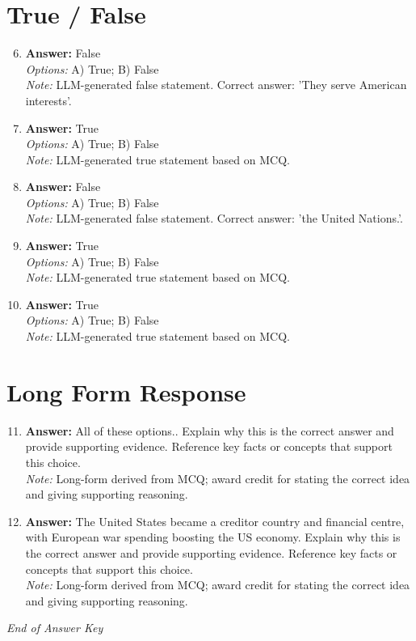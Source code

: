 \documentclass[12pt]{article}
\begin{document}
\section*{True / False}
\begin{enumerate}[label=\arabic*.]
\setcounter{enumi}{5}
\item \textbf{Answer:} False
\\ \textit{Options:} A) True; B) False
\\ \textit{Note:} LLM-generated false statement. Correct answer: 'They serve American interests'.
\item \textbf{Answer:} True
\\ \textit{Options:} A) True; B) False
\\ \textit{Note:} LLM-generated true statement based on MCQ.
\item \textbf{Answer:} False
\\ \textit{Options:} A) True; B) False
\\ \textit{Note:} LLM-generated false statement. Correct answer: 'the United Nations.'.
\item \textbf{Answer:} True
\\ \textit{Options:} A) True; B) False
\\ \textit{Note:} LLM-generated true statement based on MCQ.
\item \textbf{Answer:} True
\\ \textit{Options:} A) True; B) False
\\ \textit{Note:} LLM-generated true statement based on MCQ.
\end{enumerate}

\section*{Long Form Response}
\begin{enumerate}[label=\arabic*.]
\setcounter{enumi}{10}
\item \textbf{Answer:} All of these options.. Explain why this is the correct answer and provide supporting evidence. Reference key facts or concepts that support this choice.
\\ \textit{Note:} Long-form derived from MCQ; award credit for stating the correct idea and giving supporting reasoning.
\item \textbf{Answer:} The United States became a creditor country and financial centre, with European war spending boosting the US economy. Explain why this is the correct answer and provide supporting evidence. Reference key facts or concepts that support this choice.
\\ \textit{Note:} Long-form derived from MCQ; award credit for stating the correct idea and giving supporting reasoning.
\end{enumerate}

\vfill
\noindent\textit{End of Answer Key}
\end{document}
